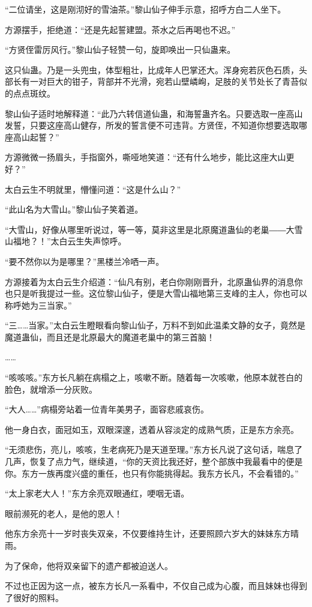 \begin{this_body}
“二位请坐，这是刚沏好的雪油茶。”黎山仙子伸手示意，招呼方白二人坐下。

方源摆手，拒绝道：“还是先起誓建盟。茶水之后再喝也不迟。”

“方贤侄雷厉风行。”黎山仙子轻赞一句，旋即唤出一只仙蛊来。

这只仙蛊。乃是一头兜虫，体型粗壮，比成年人巴掌还大。浑身宛若灰色石质，头部长有一对巨大的钳子，背部并不光滑，宛若山壁嶙峋，足肢的关节处长了青苔似的点点斑纹。

黎山仙子适时地解释道：“此乃六转信道仙蛊，和海誓蛊齐名。只要选取一座高山发誓，只要这座高山健存，所发的誓言便不可违背。方贤侄，不知道你想要选取哪座高山起誓？”

方源微微一扬眉头，手指窗外，嘶哑地笑道：“还有什么地步，能比这座大山更好？”

太白云生不明就里，懵懂问道：“这是什么山？”

“此山名为大雪山。”黎山仙子笑着道。

“大雪山，好像从哪里听说过，等一等，莫非这里是北原魔道蛊仙的老巢――大雪山福地？！”太白云生失声惊呼。

“要不然你以为是哪里？”黑楼兰冷哂一声。

方源接着为太白云生介绍道：“仙凡有别，老白你刚刚晋升，北原蛊仙界的消息你也只是听我提过一些。这位黎山仙子，便是大雪山福地第三支峰的主人，你也可以称呼她为三当家。”

“三……当家。”太白云生瞪眼看向黎山仙子，万料不到如此温柔文静的女子，竟然是魔道蛊仙，而且还是北原最大的魔道老巢中的第三首脑！

……

“咳咳咳。”东方长凡躺在病榻之上，咳嗽不断。随着每一次咳嗽，他原本就苍白的脸色，就增添一分灰败。

“大人……”病榻旁站着一位青年美男子，面容悲戚哀伤。

他一身白衣，面冠如玉，双眼深邃，透着从容淡定的成熟气质，正是东方余亮。

“无须悲伤，亮儿，咳咳，生老病死乃是天道至理。”东方长凡说了这句话，喘息了几声，恢复了点力气，继续道，“你的天资比我还好，整个部族中我最看中的便是你。东方一族再度兴盛的重任，也只有你能挑得起。我东方长凡，不会看错的。”

“太上家老大人！”东方余亮双眼通红，哽咽无语。

眼前濒死的老人，是他的恩人！

他东方余亮十一岁时丧失双亲，不仅要维持生计，还要照顾六岁大的妹妹东方晴雨。

为了保命，他将双亲留下的遗产都被迫送人。

不过也正因为这一点，被东方长凡一系看中，不仅自己成为心腹，而且妹妹也得到了很好的照料。


\end{this_body}
